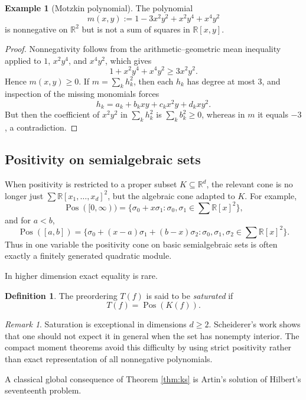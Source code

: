 \documentclass[11pt]{amsart}
\numberwithin{equation}{section}
\theoremstyle{definition}
\newtheorem{definition}[theorem]{Definition}
\newtheorem{example}[theorem]{Example}
\theoremstyle{remark}
\newtheorem{remark}[theorem]{Remark}
\newcommand{\R}{\mathbb{R}}
\newcommand{\Pos}{\operatorname{Pos}}
\newcommand{\sos}{\sum \R[x_1,\dots,x_d]^2}
\newcommand{\sosd}{\sum \R[x]^2}
\newcommand{\1}{\mathbf{1}}
\begin{document}
\begin{example}[Motzkin polynomial]
The polynomial
\[
m(x,y):=1-3x^2y^2+x^2y^4+x^4y^2
\]
is nonnegative on \(\R^2\) but is not a sum of squares in \(\R[x,y]\).
\end{example}

\begin{proof}
Nonnegativity follows from the arithmetic--geometric mean inequality applied to \(1\), \(x^2y^4\), and \(x^4y^2\), which gives
\[
1+x^2y^4+x^4y^2\ge 3x^2y^2.
\]
Hence \(m(x,y)\ge 0\). If \(m=\sum_k h_k^2\), then each \(h_k\) has degree at most \(3\), and inspection of the missing monomials forces
\[
h_k=a_k+b_kxy+c_kx^2y+d_kxy^2.
\]
But then the coefficient of \(x^2y^2\) in \(\sum_k h_k^2\) is \(\sum_k b_k^2\ge 0\), whereas in \(m\) it equals \(-3\), a contradiction.
\end{proof}

\subsection{Positivity on semialgebraic sets}

When positivity is restricted to a proper subset \(K\subseteq\R^d\), the relevant cone is no longer just \(\sos\), but the algebraic cone adapted to \(K\). For example,
\[
\Pos([0,\infty))=\{\sigma_0+x\sigma_1: \sigma_0,\sigma_1\in\sosd\},
\]
and for \(a<b\),
\[
\Pos([a,b])=\{\sigma_0+(x-a)\sigma_1+(b-x)\sigma_2: \sigma_0,\sigma_1,\sigma_2\in\sosd\}.
\]
Thus in one variable the positivity cone on basic semialgebraic sets is often exactly a finitely generated quadratic module.

In higher dimension exact equality is rare.

\begin{definition}
The preordering \(T(f)\) is said to be \emph{saturated} if
\[
T(f)=\Pos(K(f)).
\]
\end{definition}

\begin{remark}
Saturation is exceptional in dimensions \(d\ge 2\). Scheiderer's work shows that one should not expect it in general when the set has nonempty interior. The compact moment theorems avoid this difficulty by using strict positivity rather than exact representation of all nonnegative polynomials.
\end{remark}

A classical global consequence of Theorem \ref{thm:ks} is Artin's solution of Hilbert's seventeenth problem.
\end{document}
